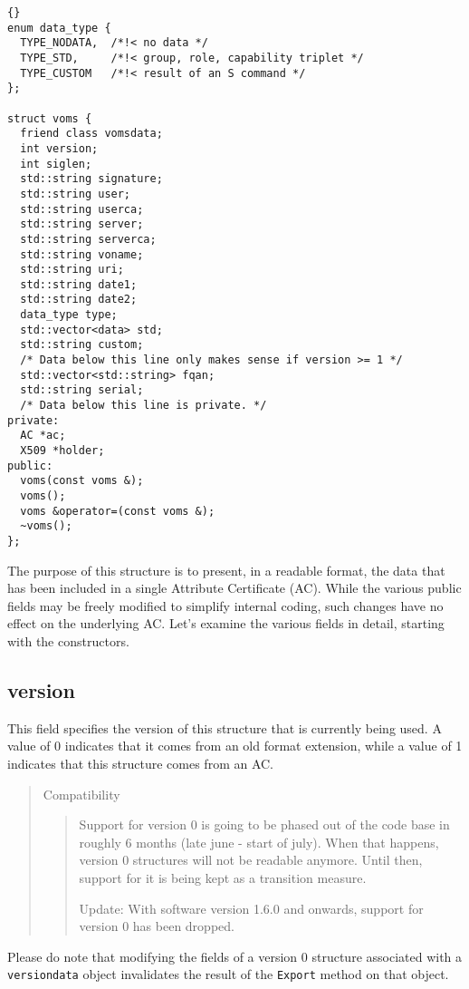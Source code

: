 \documentclass[a4paper]{book}
\newenvironment{compatibility}{\begin{quote}\color{red}Compatibility\begin{quote}}{\end{quote}\color{black}\end{quote}}
\begin{document}
\begin{lstlisting}{}
enum data_type { 
  TYPE_NODATA,  /*!< no data */
  TYPE_STD,     /*!< group, role, capability triplet */
  TYPE_CUSTOM   /*!< result of an S command */
};

struct voms {
  friend class vomsdata;
  int version;             
  int siglen;              
  std::string signature;   
  std::string user;        
  std::string userca;      
  std::string server;      
  std::string serverca;    
  std::string voname;      
  std::string uri;         
  std::string date1;       
  std::string date2;       
  data_type type;          
  std::vector<data> std;   
  std::string custom;      
  /* Data below this line only makes sense if version >= 1 */
  std::vector<std::string> fqan; 
  std::string serial;      
  /* Data below this line is private. */
private:
  AC *ac; 
  X509 *holder;
public:
  voms(const voms &);
  voms();
  voms &operator=(const voms &);
  ~voms();
};
\end{lstlisting}

The purpose of this structure is to present, in a readable format, the
data that has been included in a single Attribute Certificate
(AC).  While the various public fields may be freely modified to
simplify internal coding, such changes have no effect on the
underlying AC.  Let's examine the various fields in detail, starting
with the constructors.

\subsection{version}
This field specifies the version of this structure that is currently
being used.  A value of 0 indicates that it comes from an old format
extension, while a value of 1 indicates that this structure comes from
an AC.

\begin{compatibility}
Support for version 0 is going to be phased out of the code base in
roughly 6 months (late june - start of july).  When that happens,
version 0 structures will not be readable anymore. Until then, support
for it is being kept as a transition measure.

Update: With software version 1.6.0 and onwards, support for version 0
has been dropped. 
\end{compatibility}

Please do note that modifying the fields of a version 0 structure
associated with a \texttt{versiondata} object invalidates the result
of the \texttt{Export} method on that object.
\end{document}
